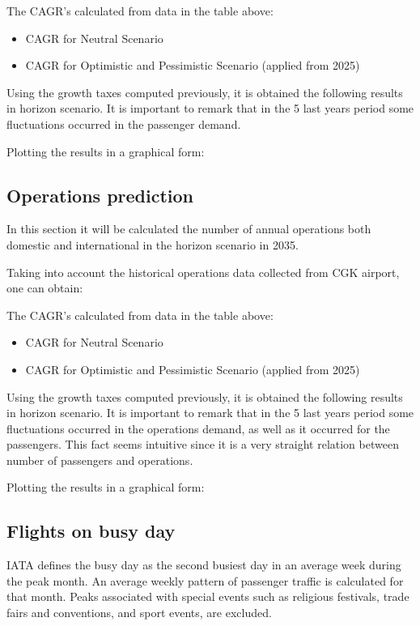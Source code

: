 The CAGR's calculated from  data in the table above:
 \begin{itemize}
 	\item CAGR for Neutral Scenario
 	
 	\item CAGR for Optimistic and Pessimistic Scenario (applied from 2025)
 \end{itemize}
	
Using the growth taxes computed previously, it is obtained the following results in horizon scenario. It is important to remark that in the 5 last years period some fluctuations occurred in the passenger demand.

Plotting the results in a graphical form:
	
	\subsection{Operations prediction}
In this section it will be calculated the number of annual operations both domestic and international in the horizon scenario in 2035.
	
Taking into account the historical operations data collected from CGK airport, one can obtain:
	
The CAGR's calculated from  data in the table above:
	\begin{itemize}
		\item CAGR for Neutral Scenario
		
		\item CAGR for Optimistic and Pessimistic Scenario (applied from 2025)
	\end{itemize}
	
Using the growth taxes computed previously, it is obtained the following results in horizon scenario. It is important to remark that in the 5 last years period some fluctuations occurred in the operations demand, as well as it occurred for the passengers. This fact seems intuitive since it is a very straight relation between number of passengers and operations.
	
Plotting the results in a graphical form:
	
	\subsection{Flights on busy day}
IATA defines the busy day as the second busiest day in an average week during the peak month. An average weekly pattern of passenger traffic is calculated for that month. Peaks associated with special events such as religious festivals, trade fairs and conventions, and sport events, are excluded.

